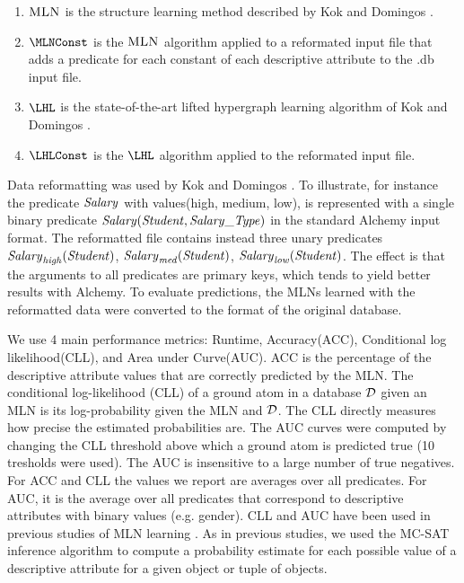 \documentclass[letterpaper]{article}
\begin{document}
\begin{enumerate}
\item $\textsc{MLN}$ is the structure learning method described by Kok and Domingos . 
\item $\MLNConst$ is the $\textsc{MLN}$ algorithm applied to a reformated input file that adds a predicate for each constant of each descriptive attribute to the .db input file. 
\item $\LHL$ is the state-of-the-art lifted hypergraph learning algorithm of Kok and Domingos .
\item $\LHLConst$ is the $\LHL$ algorithm applied to the reformated input file. 
\end{enumerate}
Data reformatting was used by Kok and Domingos . To illustrate, for instance the predicate $\it{Salary}$ with values(high, medium, low), is represented with a single binary predicate $\it{Salary}(Student, Salary\_Type)$ in the standard Alchemy input format. The reformatted file contains instead three unary predicates $\it{Salary}_{\it{high}}(\it{Student})$, $\it{Salary}_{\it{med}}(\it{Student})$, $\it{Salary}_{\it{low}}(\it{Student})$. The effect is that the arguments to all predicates are primary keys, which tends to yield better results with Alchemy. 
To evaluate predictions, the MLNs learned with the reformatted data were converted to the format of the original database.


 We use 4 main performance metrics: %
 Runtime, Accuracy(ACC), Conditional log likelihood(CLL), and Area under Curve(AUC).  
ACC is the percentage of the descriptive attribute values that are correctly predicted by the MLN.
The conditional log-likelihood (CLL) of a ground atom in a database $\mathcal{D}$ given an MLN is its log-probability given the MLN and $\mathcal{D}$. The CLL directly measures how precise the estimated probabilities are. The AUC curves were computed by changing the CLL threshold above which a ground atom is predicted true (10 tresholds were used). The AUC is insensitive to a large number of true negatives. For ACC and CLL the values we report are averages over all predicates. For AUC, it is the average over all predicates that correspond to descriptive attributes with binary values (e.g. gender). CLL and AUC have been used in previous studies of MLN learning \cite{Mihalkova2007,Kok2009}. 
As in previous studies, we used the MC-SAT inference algorithm \cite{Poon2006} to compute a probability estimate for each possible value of a descriptive attribute for a given object or tuple of objects.
\end{document}
